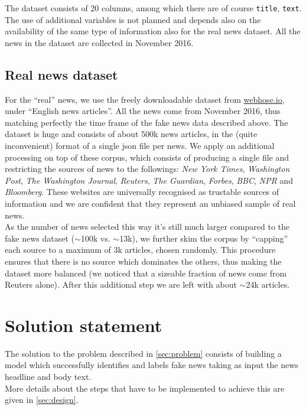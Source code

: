 \documentclass[a4paper,12pt]{article} %
\begin{document}
The dataset consists of 20 columns, among which there are 
of course \texttt{title}, \texttt{text}. 
The use of additional variables is not planned and depends also on the
availability of the same type of information also for the real news
dataset. All the news in the dataset are collected in November 2016. 

\subsection*{Real news dataset}
For the ``real'' news, we use the freely downloadable dataset from 
\href{https://webhose.io/datasets}{webhose.io}, under ``English news
articles''. All the news come from November 2016, thus matching perfectly the time
frame of the fake news data described above.  
The dataset is huge and consists of about 500k news articles, in the
(quite inconvenient) format of a single json file per news. 
We apply an additional processing on top of these corpus, which
consists of producing a single file and restricting the sources of news
to the followings: \textit{New York Times}, \textit{Washington Post},
\textit{The Washington Journal}, 
\textit{Reuters}, \textit{The Guardian}, \textit{Forbes},
\textit{BBC}, \textit{NPR} and \textit{Bloomberg}. 
These websites are universally recognised as trustable sources of
information and we are confident that they represent an unbiased
sample of real news. \\
As the number of news selected this way it's still much larger
compared to the fake news dataset ($\sim$100k vs. $\sim$13k), we further skim
the corpus by ``capping'' each source to a maximum of 3k articles, 
chosen randomly. This procedure ensures that there is no source which
dominates the others, thus making the dataset more balanced (we
noticed that a sizeable fraction of news come from Reuters alone). 
After this additional step we are left with about $\sim$24k articles.


\section{Solution statement}
The solution to the problem described in \ref{sec:problem} consists of
building a model which successfully identifies and labels fake news
taking as input the news headline and body text. \\
More details about the steps that have to be implemented to achieve
this are given in \ref{sec:design}.
\end{document}
